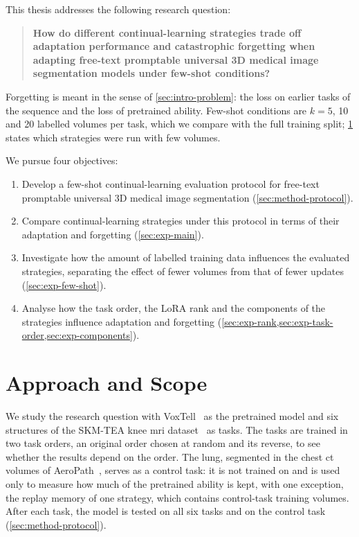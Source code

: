 This thesis addresses the following research question:
\begin{quote}
\textbf{How do different continual-learning strategies trade off adaptation performance and catastrophic forgetting when adapting free-text promptable universal 3D medical image segmentation models under few-shot conditions?}
\end{quote}
Forgetting is meant in the sense of \cref{sec:intro-problem}: the loss on earlier tasks of the sequence and the loss of pretrained ability.
Few-shot conditions are $k = 5$, 10 and 20 labelled volumes per task, which we compare with the full training split; \cref{sec:intro-approach} states which strategies were run with few volumes.

We pursue four objectives:
\begin{enumerate}
  \item Develop a few-shot continual-learning evaluation protocol for free-text promptable universal 3D medical image segmentation (\cref{sec:method-protocol}).
  \item Compare continual-learning strategies under this protocol in terms of their adaptation and forgetting (\cref{sec:exp-main}).
  \item Investigate how the amount of labelled training data influences the evaluated strategies, separating the effect of fewer volumes from that of fewer updates (\cref{sec:exp-few-shot}).
  \item Analyse how the task order, the LoRA rank and the components of the strategies influence adaptation and forgetting (\cref{sec:exp-rank,sec:exp-task-order,sec:exp-components}).
\end{enumerate}

\section{Approach and Scope}
\label{sec:intro-approach}

We study the research question with VoxTell~\cite{rokuss2025voxtellfreetextpromptableuniversal} as the pretrained model and six structures of the SKM-TEA knee \gls{mri} dataset~\cite{desai2021skmtea} as tasks.
The tasks are trained in two task orders, an original order chosen at random and its reverse, to see whether the results depend on the order.
The lung, segmented in the chest \gls{ct} volumes of AeroPath~\cite{støverud2023aeropathairwaysegmentationbenchmark}, serves as a control task: it is not trained on and is used only to measure how much of the pretrained ability is kept, with one exception, the replay memory of one strategy, which contains control-task training volumes.
After each task, the model is tested on all six tasks and on the control task (\cref{sec:method-protocol}).

